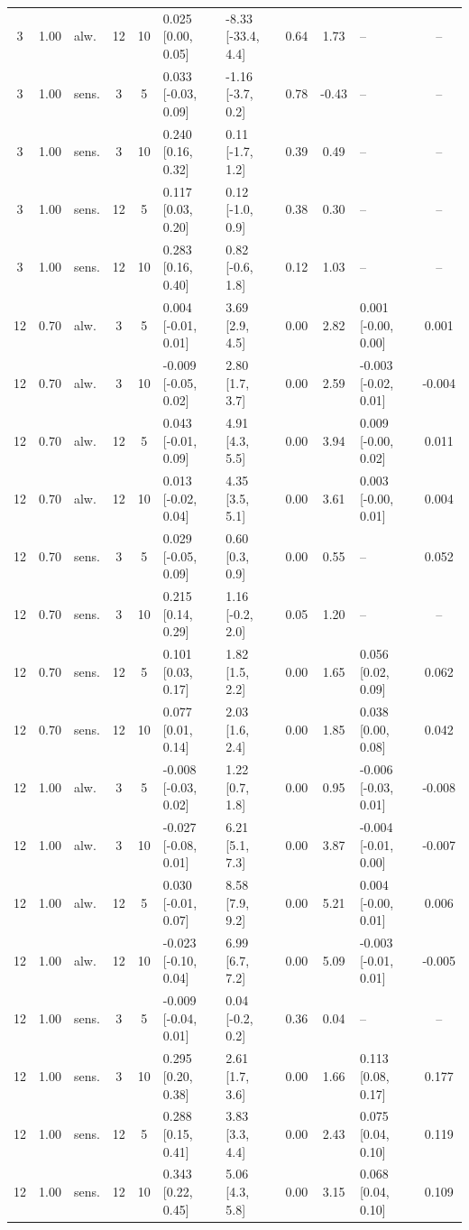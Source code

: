\documentclass[10pt]{article}
\begin{document}
\begin{scriptsize}
\begin{longtable}{cclcc l l c c l c}
3 & 1.00 & alw. & 12 & 10 & 0.025 [0.00, 0.05] & -8.33 [-33.4, 4.4] & 0.64 & 1.73 & -- & -- \\
3 & 1.00 & sens. & 3 & 5 & 0.033 [-0.03, 0.09] & -1.16 [-3.7, 0.2] & 0.78 & -0.43 & -- & -- \\
3 & 1.00 & sens. & 3 & 10 & 0.240 [0.16, 0.32] & 0.11 [-1.7, 1.2] & 0.39 & 0.49 & -- & -- \\
3 & 1.00 & sens. & 12 & 5 & 0.117 [0.03, 0.20] & 0.12 [-1.0, 0.9] & 0.38 & 0.30 & -- & -- \\
3 & 1.00 & sens. & 12 & 10 & 0.283 [0.16, 0.40] & 0.82 [-0.6, 1.8] & 0.12 & 1.03 & -- & -- \\
12 & 0.70 & alw. & 3 & 5 & 0.004 [-0.01, 0.01] & 3.69 [2.9, 4.5] & 0.00 & 2.82 & 0.001 [-0.00, 0.00] & 0.001 \\
12 & 0.70 & alw. & 3 & 10 & -0.009 [-0.05, 0.02] & 2.80 [1.7, 3.7] & 0.00 & 2.59 & -0.003 [-0.02, 0.01] & -0.004 \\
12 & 0.70 & alw. & 12 & 5 & 0.043 [-0.01, 0.09] & 4.91 [4.3, 5.5] & 0.00 & 3.94 & 0.009 [-0.00, 0.02] & 0.011 \\
12 & 0.70 & alw. & 12 & 10 & 0.013 [-0.02, 0.04] & 4.35 [3.5, 5.1] & 0.00 & 3.61 & 0.003 [-0.00, 0.01] & 0.004 \\
12 & 0.70 & sens. & 3 & 5 & 0.029 [-0.05, 0.09] & 0.60 [0.3, 0.9] & 0.00 & 0.55 & -- & 0.052 \\
12 & 0.70 & sens. & 3 & 10 & 0.215 [0.14, 0.29] & 1.16 [-0.2, 2.0] & 0.05 & 1.20 & -- & -- \\
12 & 0.70 & sens. & 12 & 5 & 0.101 [0.03, 0.17] & 1.82 [1.5, 2.2] & 0.00 & 1.65 & 0.056 [0.02, 0.09] & 0.062 \\
12 & 0.70 & sens. & 12 & 10 & 0.077 [0.01, 0.14] & 2.03 [1.6, 2.4] & 0.00 & 1.85 & 0.038 [0.00, 0.08] & 0.042 \\
12 & 1.00 & alw. & 3 & 5 & -0.008 [-0.03, 0.02] & 1.22 [0.7, 1.8] & 0.00 & 0.95 & -0.006 [-0.03, 0.01] & -0.008 \\
12 & 1.00 & alw. & 3 & 10 & -0.027 [-0.08, 0.01] & 6.21 [5.1, 7.3] & 0.00 & 3.87 & -0.004 [-0.01, 0.00] & -0.007 \\
12 & 1.00 & alw. & 12 & 5 & 0.030 [-0.01, 0.07] & 8.58 [7.9, 9.2] & 0.00 & 5.21 & 0.004 [-0.00, 0.01] & 0.006 \\
12 & 1.00 & alw. & 12 & 10 & -0.023 [-0.10, 0.04] & 6.99 [6.7, 7.2] & 0.00 & 5.09 & -0.003 [-0.01, 0.01] & -0.005 \\
12 & 1.00 & sens. & 3 & 5 & -0.009 [-0.04, 0.01] & 0.04 [-0.2, 0.2] & 0.36 & 0.04 & -- & -- \\
12 & 1.00 & sens. & 3 & 10 & 0.295 [0.20, 0.38] & 2.61 [1.7, 3.6] & 0.00 & 1.66 & 0.113 [0.08, 0.17] & 0.177 \\
12 & 1.00 & sens. & 12 & 5 & 0.288 [0.15, 0.41] & 3.83 [3.3, 4.4] & 0.00 & 2.43 & 0.075 [0.04, 0.10] & 0.119 \\
12 & 1.00 & sens. & 12 & 10 & 0.343 [0.22, 0.45] & 5.06 [4.3, 5.8] & 0.00 & 3.15 & 0.068 [0.04, 0.10] & 0.109 \\
\end{longtable}
\end{scriptsize}
\end{document}
